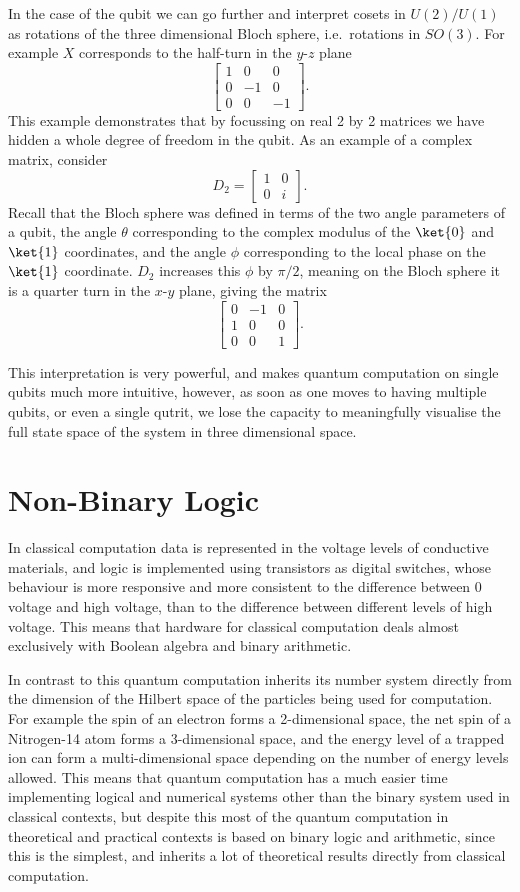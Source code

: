 In the case of the qubit we can go further and interpret cosets in $U(2)/U(1)$ as rotations of the three dimensional Bloch sphere, i.e.\ rotations in $SO(3)$. For example $X$ corresponds to the half-turn in the $y$-$z$ plane
\[\begin{bmatrix}
1 & 0 & 0 \\
0 & -1 & 0 \\
0 & 0 & -1
\end{bmatrix}.\]
This example demonstrates that by focussing on real 2 by 2 matrices we have hidden a whole degree of freedom in the qubit. As an example of a complex matrix, consider
\[D_2 = \begin{bmatrix}
1 & 0 \\
0 & i
\end{bmatrix}.\]
Recall that the Bloch sphere was defined in terms of the two angle parameters of a qubit, the angle $\theta$ corresponding to the complex modulus of the $\ket{0}$ and $\ket{1}$ coordinates, and the angle $\phi$ corresponding to the local phase on the $\ket{1}$ coordinate. $D_2$ increases this $\phi$ by $\pi/2$, meaning on the Bloch sphere it is a quarter turn in the $x$-$y$ plane, giving the matrix
\[\begin{bmatrix}
	0 & -1 & 0 \\
	1 & 0 & 0 \\
	0 & 0 & 1
\end{bmatrix}.\]

This interpretation is very powerful, and makes quantum computation on single qubits much more intuitive, however, as soon as one moves to having multiple qubits, or even a single qutrit, we lose the capacity to meaningfully visualise the full state space of the system in three dimensional space.

\section{Non-Binary Logic}
In classical computation data is represented in the voltage levels of conductive materials, and logic is implemented using transistors as digital switches, whose behaviour is more responsive and more consistent to the difference between 0 voltage and high voltage, than to the difference between different levels of high voltage. This means that hardware for classical computation deals almost exclusively with Boolean algebra and binary arithmetic.

In contrast to this quantum computation inherits its number system directly from the dimension of the Hilbert space of the particles being used for computation. For example the spin of an electron forms a 2-dimensional space, the net spin of a Nitrogen-14 atom forms a 3-dimensional space, and the energy level of a trapped ion can form a multi-dimensional space depending on the number of energy levels allowed. This means that quantum computation has a much easier time implementing logical and numerical systems other than the binary system used in classical contexts, but despite this most of the quantum computation in theoretical and practical contexts is based on binary logic and arithmetic, since this is the simplest, and inherits a lot of theoretical results directly from classical computation.

